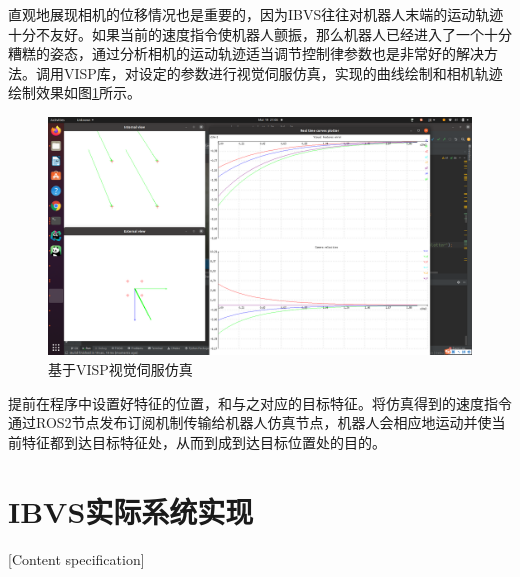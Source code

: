 \documentclass[fontset=fandol,type=bachelor,campus=harbin]{hithesisbook}
\begin{document}
直观地展现相机的位移情况也是重要的，因为IBVS往往对机器人末端的运动轨迹十分不友好。如果当前的速度指令使机器人颤振，那么机器人已经进入了一个十分糟糕的姿态，通过分析相机的运动轨迹适当调节控制律参数也是非常好的解决方法。调用VISP库，对设定的参数进行视觉伺服仿真，实现的曲线绘制和相机轨迹绘制效果如图\ref{基于VISP视觉伺服仿真}所示。
\begin{figure}[h]
\centering
\includegraphics[width = 1.0\textwidth]{chapter2/基于VISP视觉伺服仿真}
\caption{基于VISP视觉伺服仿真}
\label{基于VISP视觉伺服仿真}
\end{figure}


提前在程序中设置好特征的位置，和与之对应的目标特征。将仿真得到的速度指令通过ROS2节点发布订阅机制传输给机器人仿真节点，机器人会相应地运动并使当前特征都到达目标特征处，从而到成到达目标位置处的目的。
\section{IBVS实际系统实现}[Content specification]
\end{document}
